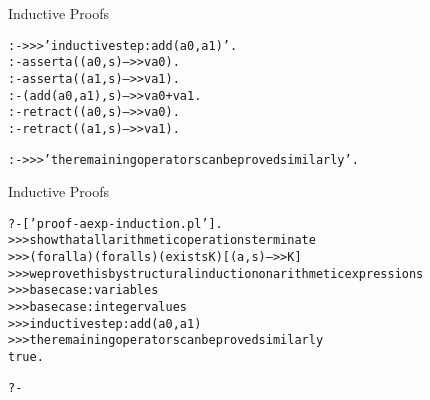 \documentclass{beamer}
\begin{document}
\begin{frame}[fragile]{Inductive Proofs}
\scriptsize
\begin{alltt}
:- >>> 'inductive step: add(a0,a1)'.                                                            
%%% inductive hypotheses                                                                        
:- asserta((a0,s)-->>va0).                                                                      
:- asserta((a1,s)-->>va1).                                                                      
%%% induction step                                                                              
:- (add(a0,a1),s)-->>va0+va1.                                                                   
%%% clean up                                                                                    
:- retract((a0,s)-->>va0).                                                                      
:- retract((a1,s)-->>va1).                                                                      
                                                                                                
:- >>> 'the remaining operators can be proved similarly'.
\end{alltt}
\end{frame}

\begin{frame}[fragile]{Inductive Proofs}
\scriptsize
\begin{alltt}
?- ['proof-aexp-induction.pl'].
%   xis.pl compiled 0.00 sec, 6,920 bytes
%  preamble.pl compiled 0.00 sec, 8,108 bytes
>>> show that all arithmetic operations terminate
>>>   (forall a)(forall s)(exists K)[(a,s)-->>K]
>>> we prove this by structural induction on arithmetic expressions
%    xis.pl compiled 0.00 sec, 136 bytes
%   preamble.pl compiled 0.00 sec, 264 bytes
%   xis.pl compiled 0.00 sec, 136 bytes
%  sem.pl compiled 0.00 sec, 5,960 bytes
>>> base case: variables
>>> base case: integer values
>>> inductive step: add(a0,a1)
>>> the remaining operators can be proved similarly
% proof-aexp-induction.pl compiled 0.01 sec, 16,188 bytes
true.

?- 
\end{alltt}
\end{frame}
\end{document}
